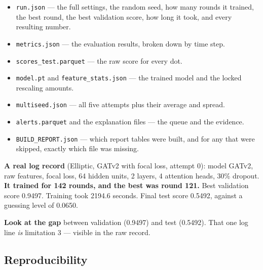 \documentclass[11pt,a4paper]{article}
\newcommand{\code}[1]{\texttt{\small #1}}
\begin{document}
\begin{itemize}
  \item \code{run.json} --- the full settings, the random seed, how many rounds it
        trained, the best round, the best validation score, how long it took, and
        every resulting number.
  \item \code{metrics.json} --- the evaluation results, broken down by time step.
  \item \code{scores\_test.parquet} --- the raw score for every dot.
  \item \code{model.pt} and \code{feature\_stats.json} --- the trained model and the
        locked rescaling amounts.
  \item \code{multiseed.json} --- all five attempts plus their average and spread.
  \item \code{alerts.parquet} and the explanation files --- the queue and the
        evidence.
  \item \code{BUILD\_REPORT.json} --- which report tables were built, and for any
        that were skipped, exactly which file was missing.
\end{itemize}

\begin{plain}
\textbf{A real log record} (Elliptic, GATv2 with focal loss, attempt 0):
model GATv2, raw features, focal loss, 64 hidden units, 2 layers, 4 attention
heads, 30\% dropout. \textbf{It trained for 142 rounds, and the best was round
121.} Best validation score 0.9497. Training took 2194.6 seconds. Final test score
0.5492, against a guessing level of 0.0650.

\textbf{Look at the gap} between validation (0.9497) and test (0.5492). That one
log line \emph{is} limitation 3 --- visible in the raw record.
\end{plain}

\subsection{Reproducibility}
\end{document}
